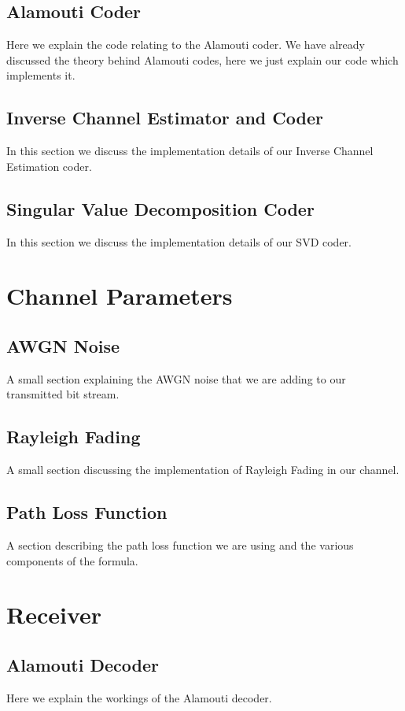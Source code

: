\subsection{Alamouti Coder}
Here we explain the code relating to the Alamouti coder. We have already discussed the theory behind Alamouti codes, here we just explain our code which implements it.


\subsection{Inverse Channel Estimator and Coder}
In this section we discuss the implementation details of our Inverse Channel Estimation coder.


\subsection{Singular Value Decomposition Coder}
In this section we discuss the implementation details of our SVD coder. 

\section{Channel Parameters}

\subsection{AWGN Noise}
A small section explaining the AWGN noise that we are adding to our transmitted bit stream.

\subsection{Rayleigh Fading}
A small section discussing the implementation of Rayleigh Fading in our channel.

\subsection{Path Loss Function}
A section describing the path loss function we are using and the various components of the formula.


\section{Receiver}

\subsection{Alamouti Decoder}
Here we explain the workings of the Alamouti decoder.

